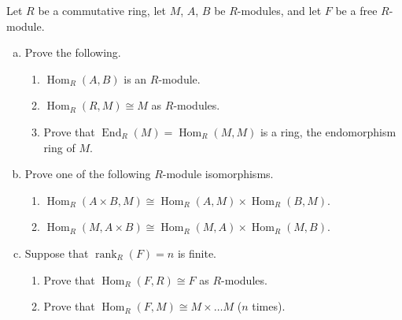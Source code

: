 \documentclass[10pt]{amsart}
\newcommand{\Hom}[2]{\operatorname{Hom}_{#1}\left(#2\right)}
\newcommand{\End}[2]{\operatorname{End}_{#1}\left(#2\right)}
\begin{document}
\begin{thm}
Let $R$ be a commutative ring, let $M$, $A$, $B$ be $R$-modules, and let $F$ be a free $R$-module.
\begin{enumerate}[(a)]
	\item
		Prove the following.
		\begin{enumerate}
			\item
				$\Hom{R}{A,B}$ is an $R$-module.
			\item
				$\Hom{R}{R,M} \cong M$ as $R$-modules.
			\item
				Prove that $\End{R}{M} = \Hom{R}{M,M}$ is a ring, the endomorphism ring of $M$.
		\end{enumerate}
	\item
		Prove one of the following $R$-module isomorphisms.
		\begin{enumerate}
			\item
				$\Hom{R}{A \times B, M} \cong \Hom{R}{A,M} \times \Hom{R}{B,M}$.
			\item
				$\Hom{R}{M, A \times B} \cong \Hom{R}{M,A} \times \Hom{R}{M,B}$.
		\end{enumerate}
	\item
		Suppose that $\operatorname{rank}_R(F) = n$ is finite.
		\begin{enumerate}
			\item
				Prove that $\Hom{R}{F,R} \cong F$ as $R$-modules.
			\item
				Prove that $\Hom{R}{F,M} \cong M \times \ldots M$ ($n$ times).
		\end{enumerate}
\end{enumerate}


\end{thm}
\end{document}
